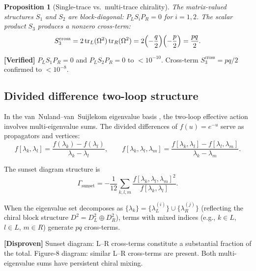 \documentclass[11pt,a4paper]{article}
\newcommand{\tr}{\mathrm{tr}}
\newtheorem{proposition}[theorem]{Proposition}
\theoremstyle{definition}
\newcommand{\verified}[1]{%
  \par\smallskip\noindent
  \colorbox{green!10}{\parbox{\dimexpr\linewidth-2\fboxsep}{%
    \textcolor{proven}{\textbf{[Verified]}} #1}}%
  \par\smallskip}
\newcommand{\disproof}[1]{%
  \par\smallskip\noindent
  \colorbox{red!10}{\parbox{\dimexpr\linewidth-2\fboxsep}{%
    \textcolor{disproven}{\textbf{[Disproven]}} #1}}%
  \par\smallskip}
\begin{document}
\begin{proposition}[Single-trace vs.\ multi-trace chirality]
\label{prop:single-multi}
The matrix-valued structures $S_1$ and $S_2$ are block-diagonal:
$P_L S_i P_R = 0$ for $i = 1, 2$.  The scalar product $S_3$ produces a
nonzero cross-term:
\begin{equation}\label{eq:S3-cross}
  S_3^{\mathrm{cross}}
  = 2\,\tr_L(\Omega^2)\,\tr_R(\Omega^2)
  = 2\Bigl(-\frac{q}{2}\Bigr)\Bigl(-\frac{p}{2}\Bigr)
  = \frac{pq}{2}.
\end{equation}
\end{proposition}

\verified{%
  $P_L S_1 P_R = 0$ and $P_L S_2 P_R = 0$ to $< 10^{-10}$.
  Cross-term $S_3^{\mathrm{cross}} = pq/2$ confirmed to $< 10^{-8}$.}

\subsection{Divided difference two-loop structure}\label{sec:divided-diff}

In the van~Nuland--van~Suijlekom eigenvalue basis \cite{vNvS2021}, the two-loop
effective action involves multi-eigenvalue sums.  The divided differences of
$f(u) = e^{-u}$ serve as propagators and vertices:
\begin{equation}
  f[\lambda_k, \lambda_l]
  = \frac{f(\lambda_k) - f(\lambda_l)}{\lambda_k - \lambda_l}, \qquad
  f[\lambda_k, \lambda_l, \lambda_m]
  = \frac{f[\lambda_k, \lambda_l] - f[\lambda_l, \lambda_m]}
        {\lambda_k - \lambda_m}.
\end{equation}

The sunset diagram structure is
\begin{equation}\label{eq:sunset}
  \Gamma_{\mathrm{sunset}}
  = -\frac{1}{12}\sum_{k,l,m}
    \frac{f[\lambda_k, \lambda_l, \lambda_m]^2}
         {f[\lambda_k, \lambda_l]}.
\end{equation}

When the eigenvalue set decomposes as
$\{\lambda_k\} = \{\lambda_L^{(i)}\} \cup \{\lambda_R^{(j)}\}$ (reflecting the
chiral block structure $D^2 = D^2_L \oplus D^2_R$), terms with mixed indices
(e.g., $k \in L$, $l \in L$, $m \in R$) generate $pq$ cross-terms.

\disproof{%
  Sunset diagram: L--R cross-terms constitute a substantial fraction of the
  total.  Figure-8 diagram: similar L--R cross-terms are present.  Both
  multi-eigenvalue sums have persistent chiral mixing.}


\end{document}

